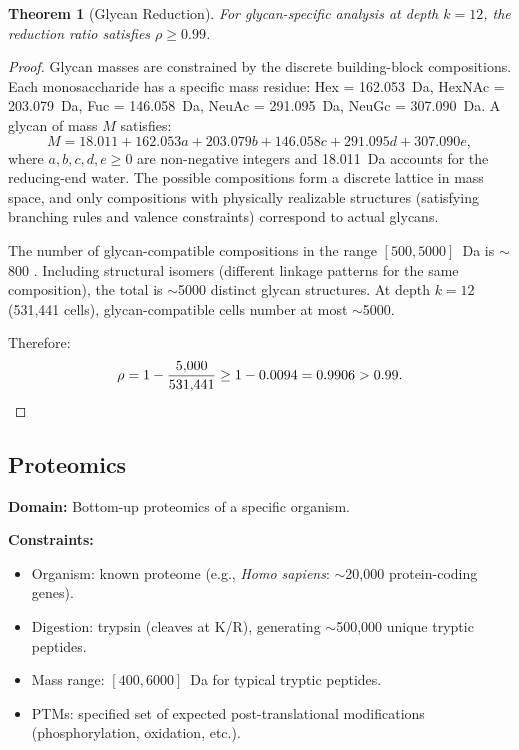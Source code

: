 \documentclass[11pt,twocolumn,a4paper]{article}
\newtheorem{theorem}{Theorem}[section]
\theoremstyle{definition}
\theoremstyle{remark}
\begin{document}
\begin{theorem}[Glycan Reduction]\label{thm:glycan-reduction}
For glycan-specific analysis at depth $k = 12$, the reduction ratio satisfies $\rho \geq 0.99$.
\end{theorem}

\begin{proof}
Glycan masses are constrained by the discrete building-block compositions. Each monosaccharide has a specific mass residue: Hex = 162.053~Da, HexNAc = 203.079~Da, Fuc = 146.058~Da, NeuAc = 291.095~Da, NeuGc = 307.090~Da. A glycan of mass $M$ satisfies:
\begin{equation}
  M = 18.011 + 162.053 a + 203.079 b + 146.058 c + 291.095 d + 307.090 e,
\end{equation}
where $a, b, c, d, e \geq 0$ are non-negative integers and 18.011~Da accounts for the reducing-end water. The possible compositions form a discrete lattice in mass space, and only compositions with physically realizable structures (satisfying branching rules and valence constraints) correspond to actual glycans.

The number of glycan-compatible compositions in the range $[500, 5000]$~Da is $\sim$800 \citep{nist_glycan}. Including structural isomers (different linkage patterns for the same composition), the total is $\sim$5000 distinct glycan structures. At depth $k = 12$ (531,441 cells), glycan-compatible cells number at most $\sim$5000.

Therefore:
\begin{equation}
  \rho = 1 - \frac{5{,}000}{531{,}441} \geq 1 - 0.0094 = 0.9906 > 0.99. \qedhere
\end{equation}
\end{proof}

\subsection{Proteomics}\label{sec:proteomics-bounds}

\textbf{Domain:} Bottom-up proteomics of a specific organism.

\textbf{Constraints:}
\begin{itemize}
  \item Organism: known proteome (e.g., \emph{Homo sapiens}: $\sim$20{,}000 protein-coding genes).
  \item Digestion: trypsin (cleaves at K/R), generating $\sim$500{,}000 unique tryptic peptides.
  \item Mass range: $[400, 6000]$~Da for typical tryptic peptides.
  \item PTMs: specified set of expected post-translational modifications (phosphorylation, oxidation, etc.).
\end{itemize}
\end{document}
